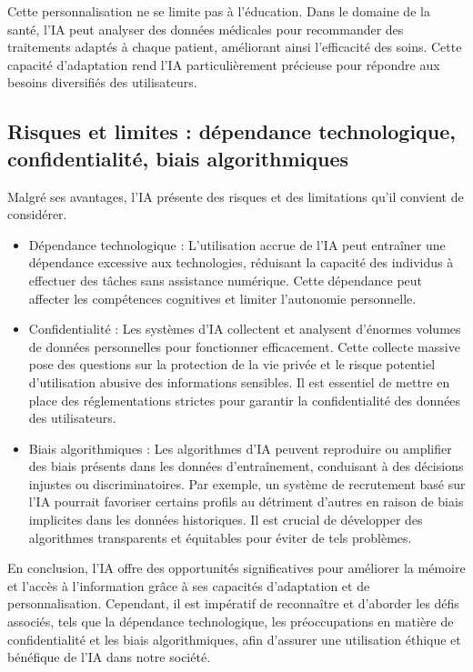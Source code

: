 \documentclass[12pt,a4paper]{report}
\begin{document}
Cette personnalisation ne se limite pas à l'éducation. Dans le domaine de la santé, l'IA peut analyser des données médicales pour recommander des traitements adaptés à chaque patient, améliorant ainsi l'efficacité des soins. Cette capacité d'adaptation rend l'IA particulièrement précieuse pour répondre aux besoins diversifiés des utilisateurs.

\subsection{Risques et limites : dépendance technologique, confidentialité, biais algorithmiques}

Malgré ses avantages, l'IA présente des risques et des limitations qu'il convient de considérer.

\begin{itemize}
    \item Dépendance technologique : L'utilisation accrue de l'IA peut entraîner une dépendance excessive aux technologies, réduisant la capacité des individus à effectuer des tâches sans assistance numérique. Cette dépendance peut affecter les compétences cognitives et limiter l'autonomie personnelle.

    \item Confidentialité : Les systèmes d'IA collectent et analysent d'énormes volumes de données personnelles pour fonctionner efficacement. Cette collecte massive pose des questions sur la protection de la vie privée et le risque potentiel d'utilisation abusive des informations sensibles. Il est essentiel de mettre en place des réglementations strictes pour garantir la confidentialité des données des utilisateurs.

    \item Biais algorithmiques : Les algorithmes d'IA peuvent reproduire ou amplifier des biais présents dans les données d'entraînement, conduisant à des décisions injustes ou discriminatoires. Par exemple, un système de recrutement basé sur l'IA pourrait favoriser certains profils au détriment d'autres en raison de biais implicites dans les données historiques. Il est crucial de développer des algorithmes transparents et équitables pour éviter de tels problèmes.
\end{itemize}

En conclusion, l'IA offre des opportunités significatives pour améliorer la mémoire et l'accès à l'information grâce à ses capacités d'adaptation et de personnalisation. Cependant, il est impératif de reconnaître et d'aborder les défis associés, tels que la dépendance technologique, les préoccupations en matière de confidentialité et les biais algorithmiques, afin d'assurer une utilisation éthique et bénéfique de l'IA dans notre société.
\end{document}
